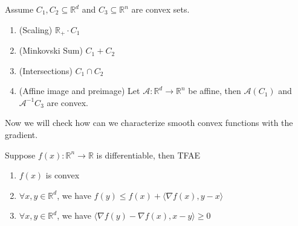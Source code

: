 \begin{lemma}
    Assume $C_1, C_2 \subseteq \mathbb{R}^d$ and $C_3 \subseteq \mathbb{R}^n$ are convex sets.
    \begin{enumerate}
        \item (Scaling) $\mathbb{R}_+ \cdot C_1$
        \item (Minkovski Sum) $C_1 + C_2$
        \item (Intersections) $C_1 \cap C_2$
        \item (Affine image and preimage) Let $\mathcal{A}:\mathbb{R}^d \rightarrow \mathbb{R}^n$ be affine, then $\mathcal{A}(C_1)$ and $\mathcal{A}^{-1}C_3$ are convex.
    \end{enumerate}
\end{lemma}

Now we will check how can we characterize smooth convex functions with the gradient.

\begin{proposition}
    Suppose $f(x): \mathbb{R}^n \rightarrow \mathbb{R}$ is differentiable, then TFAE
    \begin{enumerate}
        \item $f(x)$ is convex
        \item $\forall x,y \in \mathbb{R}^d$, we have $f(y) \leq f(x) + \langle \nabla f(x), y-x \rangle$
        \item $\forall x,y \in \mathbb{R}^d$, we have $\langle \nabla f(y) - \nabla f(x), x-y \rangle \geq 0$
    \end{enumerate}
\end{proposition}